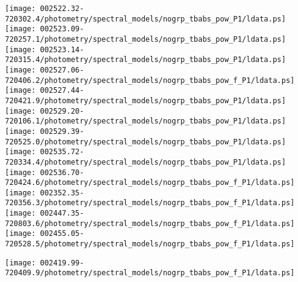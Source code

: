 \documentclass{aastex}
\begin{document}
\begin{figure*}[!ht]
\centering
\texttt{[image: 002522.32-720302.4/photometry/spectral\_models/nogrp\_tbabs\_pow\_P1/ldata.ps]} \hfill 
\texttt{[image: 002523.09-720257.1/photometry/spectral\_models/nogrp\_tbabs\_pow\_P1/ldata.ps]} \hfill 
\texttt{[image: 002523.14-720315.4/photometry/spectral\_models/nogrp\_tbabs\_pow\_P1/ldata.ps]} \\ 
\vspace*{0.5in}
\texttt{[image: 002527.06-720406.2/photometry/spectral\_models/nogrp\_tbabs\_pow\_f\_P1/ldata.ps]} \hfill 
\texttt{[image: 002527.44-720421.9/photometry/spectral\_models/nogrp\_tbabs\_pow\_P1/ldata.ps]} \hfill 
\texttt{[image: 002529.20-720106.1/photometry/spectral\_models/nogrp\_tbabs\_pow\_P1/ldata.ps]} \\ 
\vspace*{0.5in}
\texttt{[image: 002529.39-720525.0/photometry/spectral\_models/nogrp\_tbabs\_pow\_P1/ldata.ps]} \hfill 
\texttt{[image: 002535.72-720334.4/photometry/spectral\_models/nogrp\_tbabs\_pow\_P1/ldata.ps]} \hfill 
\texttt{[image: 002536.70-720424.6/photometry/spectral\_models/nogrp\_tbabs\_pow\_f\_P1/ldata.ps]} \\ 
\vspace*{0.5in}
\texttt{[image: 002352.35-720356.3/photometry/spectral\_models/nogrp\_tbabs\_pow\_f\_P1/ldata.ps]} \hfill 
\texttt{[image: 002447.35-720803.6/photometry/spectral\_models/nogrp\_tbabs\_pow\_f\_P1/ldata.ps]} \hfill 
\texttt{[image: 002455.05-720528.5/photometry/spectral\_models/nogrp\_tbabs\_pow\_f\_P1/ldata.ps]} \\ 
\vspace*{0.5in}
\end{figure*}
\clearpage
\begin{figure*}[!ht]
\centering
\texttt{[image: 002419.99-720409.9/photometry/spectral\_models/nogrp\_tbabs\_pow\_f\_P1/ldata.ps]} \hfill 
\end{figure*}
\end{document}
